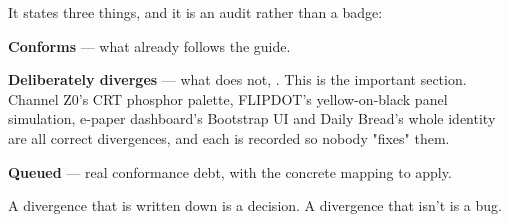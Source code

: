 \documentclass[fontpath=fonts/,logopath=logo/]{riposte-doc}
\begin{document}

It states three things, and it is an audit rather than a badge:

\begin{ripnumbers}
\item \textbf{Conforms} — what already follows the guide.
\item \textbf{Deliberately diverges} — what does not, . This is the important section. Channel Z0's CRT phosphor palette, FLIPDOT's yellow-on-black panel simulation, e-paper dashboard's Bootstrap UI and Daily Bread's whole identity are all correct divergences, and each is recorded so nobody "fixes" them.
\item \textbf{Queued} — real conformance debt, with the concrete mapping to apply.
\end{ripnumbers}

A divergence that is written down is a decision. A divergence that isn't is a bug.

\ripend
\end{document}
